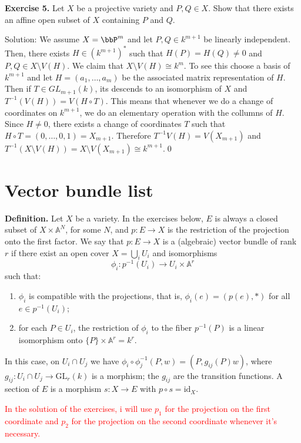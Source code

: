 \begin{dang}
    \textbf{Exercise 5.} Let $X$ be a projective variety and $P, Q \in X$. 
    Show that there exists an affine open subset of $X$ containing $P$ and $Q$.
\end{dang}
Solution: We assume $X=\bbP^m$ and let $P,Q\in k^{m+1}$ be linearly independent. Then, there exists 
$H\in (k^{m+1})^*$ such that $H(P)=H(Q)\neq0$ and $P, Q\in X\setminus V(H)$. We claim that $X\setminus V(H)\cong k^m$. To see this 
choose a basis of $k^{m+1}$ and let $H=(a_1,\dots, a_m)$ be the associated matrix representation of $H$. Then 
if $T\in GL_{m+1}(k)$, its descends to an isomorphism of $X$ and $T^{-1}(V(H))=V(H\circ T)$. This means that whenever we 
do a change of coordinates on $k^{m+1}$, we do an elementary operation with the collumns of $H$. Since 
$H\neq0$, there exists a change of coordinates $T$ such that $H\circ T = (0,\dots,0,1) = X_{m+1}$. Therefore 
$T^{-1}V(H) = V(X_{m+1})$ and $T^{-1}(X\setminus V(H)) = X\setminus V(X_{m+1})\cong k^{m+1}$.\qed


\section{Vector bundle list}
\noindent\textbf{Definition.} Let $X$ be a variety. In the exercises below, $E$ is always a closed subset of $X\times\mathbb{A}^N$, for some $N$, and $p\colon E\to X$ is the restriction of the projection onto the first factor. We say that $p\colon E\to X$ is a (algebraic) vector bundle of rank $r$ if there exist an open cover $X=\bigcup_i U_i$ and isomorphisms
\[
\phi_i\colon p^{-1}(U_i)\to U_i\times\mathbb{A}^r
\]
such that:
\begin{enumerate}
\item[(i)] $\phi_i$ is compatible with the projections, that is, $\phi_i(e)=(p(e),*)$ for all $e\in p^{-1}(U_i)$;
\item[(ii)] for each $P\in U_i$, the restriction of $\phi_i$ to the fiber $p^{-1}(P)$ is a linear isomorphism onto $\{P\}\times\mathbb{A}^r=k^r$.
\end{enumerate}
In this case, on $U_i\cap U_j$ we have $\phi_i\circ\phi_j^{-1}(P,w)=(P,g_{ij}(P)w)$, where $g_{ij}\colon U_i\cap U_j\to\mathrm{GL}_r(k)$ is a morphism; the $g_{ij}$ are the transition functions. A section of $E$ is a morphism $s\colon X\to E$ with $p\circ s=\mathrm{id}_X$.

\begin{center}
    \textcolor{red}{In the solution of the exercises, i will use $p_1$ for the projection on the first coordinate and 
    $p_2$ for the projection on the second coordinate whenever it's necessary.}
\end{center}

